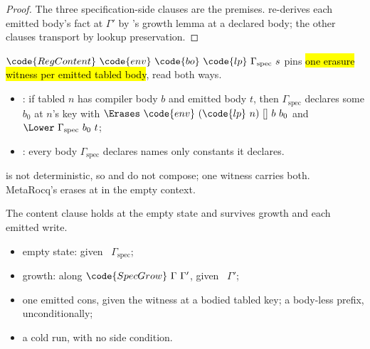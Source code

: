 \begin{proof}
\leanok
{}
 The three specification-side clauses are the premises.  re-derives each emitted
body's \Lower{} fact at $\Gamma'$ by \Lower{}'s growth lemma at a declared body; the other clauses
transport by lookup preservation.
\end{proof}
\begin{definition}
\label{def:RegContent}
\leanok
{}
 $\code{RegContent}\ \code{env}\ \code{bo}\ \code{lp}\ \Gamma_{\mathrm{spec}}\ s$ pins
\hl{one erasure witness per emitted tabled body}, read both ways.
\begin{itemize}
\item {}: if tabled $n$ has compiler body $b$ and emitted body $t$, then
$\Gamma_{\mathrm{spec}}$ declares some $b_0$ at $n$'s key with
$\Erases\ \code{env}\ (\code{lp}\ n)\ []\ b\ b_0$ and $\Lower\ \Gamma_{\mathrm{spec}}\ b_0\ t$;
\item {}: every body $\Gamma_{\mathrm{spec}}$ declares names only constants it declares.
\end{itemize}
 \Erases{} is not deterministic, so  and  do
not compose; one witness carries both.
 MetaRocq's  erases at  in the empty context.
\end{definition}
\begin{lemma}
\label{lem:RegContent-specGrow}
\leanok
{}
 The content clause holds at the empty state and survives growth and each emitted write.
\begin{itemize}
\item empty state: given \ $\Gamma_{\mathrm{spec}}$;
\item growth: along $\code{SpecGrow}\ \Gamma\ \Gamma'$, given \ $\Gamma'$;
\item one emitted cons, given the witness at a bodied tabled key; a body-less prefix, unconditionally;
\item a cold  run, with no side condition.
\end{itemize}
\end{lemma}

